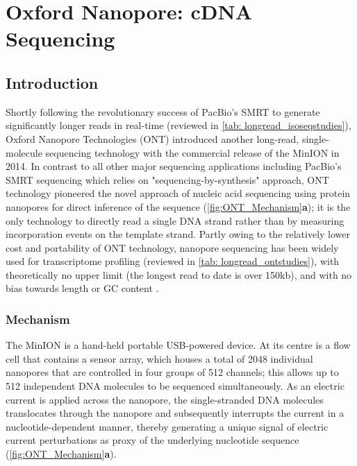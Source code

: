 \clearpage

\section{Oxford Nanopore: cDNA Sequencing}
\label{sec:ONT_cDNA_Sequencing}

\subsection{Introduction}
Shortly following the revolutionary success of PacBio's SMRT to generate significantly longer reads in real-time (reviewed in \cref{tab: longread_isoseqstudies}), Oxford Nanopore Technologies (ONT) introduced another long-read, single-molecule sequencing technology with the commercial release of the MinION in 2014. In contrast to all other major sequencing applications including PacBio's SMRT sequencing which relies on "sequencing-by-synthesis" approach, ONT technology pioneered the novel approach of nucleic acid sequencing using protein nanopores for direct inference of the sequence (\cref{fig:ONT_Mechanism}\textbf{a}); it is the only technology to directly read a single DNA strand rather than by measuring incorporation events on the template strand\cite{Jain2015}. Partly owing to the relatively lower cost and portability of ONT technology, nanopore sequencing has been widely used for transcriptome profiling (reviewed in \cref{tab: longread_ontstudies}), 
with theoretically no upper limit \cite{Loman2015} (the longest read to date is over 150kb), and with no bias towards length or GC content \cite{Oikonomopoulos2016, Weirather2017}.


\subsubsection{Mechanism}
The MinION is a hand-held portable USB-powered device. At its centre is a flow cell that contains a sensor array, which houses a total of 2048 individual nanopores that are controlled in four groups of 512 channels; this allows up to 512 independent DNA molecules to be sequenced simultaneously\cite{Jain2015}. As an electric current is applied across the nanopore, the single-stranded DNA molecules translocates through the nanopore and subsequently interrupts the current in a nucleotide-dependent manner, thereby generating a unique signal of electric current perturbations as proxy of the underlying nucleotide sequence (\cref{fig:ONT_Mechanism}\textbf{a}). 

